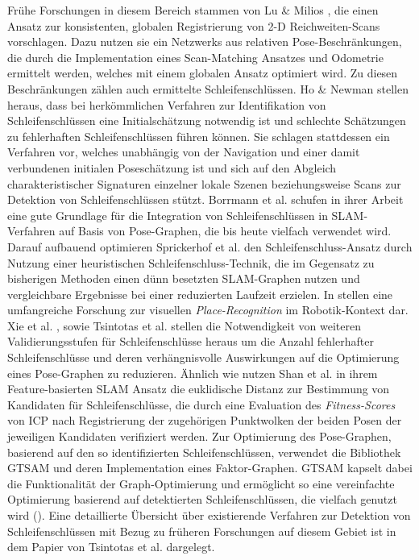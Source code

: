 Frühe Forschungen in diesem Bereich stammen von Lu \& Milios \cite{lu1997globally}, die einen Ansatz zur konsistenten, globalen Registrierung von 2-D Reichweiten-Scans vorschlagen. Dazu nutzen sie ein Netzwerks aus relativen Pose-Beschränkungen, die durch die Implementation eines Scan-Matching Ansatzes und Odometrie ermittelt werden, welches mit einem globalen Ansatz optimiert wird. Zu diesen Beschränkungen zählen auch ermittelte Schleifenschlüssen. Ho \& Newman \cite{ho2006loop} stellen heraus, dass bei herkömmlichen Verfahren zur Identifikation von Schleifenschlüssen eine Initialschätzung notwendig ist und schlechte Schätzungen zu fehlerhaften Schleifenschlüssen führen können. Sie schlagen stattdessen ein Verfahren vor, welches unabhängig von der Navigation und einer damit verbundenen initialen Poseschätzung ist und sich auf den Abgleich charakteristischer Signaturen einzelner lokale Szenen beziehungsweise Scans zur Detektion von Schleifenschlüssen stützt. Borrmann et al. \cite{borrmann2008globally} schufen in ihrer Arbeit eine gute Grundlage für die Integration von Schleifenschlüssen in SLAM-Verfahren auf Basis von Pose-Graphen, die bis heute vielfach verwendet wird. Darauf aufbauend optimieren Sprickerhof et al. \cite{sprickerhof2011heuristic} den Schleifenschluss-Ansatz durch Nutzung einer heuristischen Schleifenschluss-Technik, die im Gegensatz zu bisherigen Methoden einen dünn besetzten SLAM-Graphen nutzen und vergleichbare Ergebnisse bei einer reduzierten Laufzeit erzielen. In \cite{lowry2015visual} stellen eine umfangreiche Forschung zur visuellen \emph{Place-Recognition} im Robotik-Kontext dar. Xie et al. \cite{xie2017graphtinker}, sowie Tsintotas et al. \cite{tsintotas2022revisiting} stellen die Notwendigkeit von weiteren Validierungsstufen für Schleifenschlüsse heraus um die Anzahl fehlerhafter Schleifenschlüsse und deren verhängnisvolle Auswirkungen auf die Optimierung eines Pose-Graphen zu reduzieren. Ähnlich wie \cite{borrmann2008globally} nutzen Shan et al. \cite{shan2020lio} in ihrem Feature-basierten SLAM Ansatz die euklidische Distanz zur Bestimmung von Kandidaten für Schleifenschlüsse, die durch eine Evaluation des \emph{Fitness-Scores} von ICP nach Registrierung der zugehörigen Punktwolken der beiden Posen der jeweiligen Kandidaten verifiziert werden. Zur Optimierung des Pose-Graphen, basierend auf den so identifizierten Schleifenschlüssen, verwendet \cite{shan2020lio} die Bibliothek GTSAM \cite{dellaert2012factor} und deren Implementation eines Faktor-Graphen. GTSAM kapselt dabei die Funktionalität der Graph-Optimierung und ermöglicht so eine vereinfachte Optimierung basierend auf detektierten Schleifenschlüssen, die vielfach genutzt wird (\cite{shan2020lio}). Eine detaillierte Übersicht über existierende Verfahren zur Detektion von Schleifenschlüssen mit Bezug zu früheren Forschungen auf diesem Gebiet ist in dem Papier von Tsintotas et al. \cite{tsintotas2022revisiting} dargelegt.  

